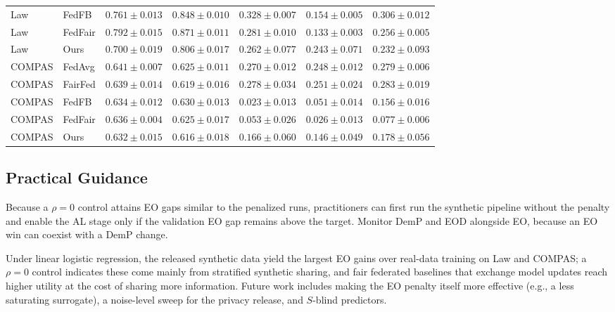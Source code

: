 \begin{table}[!t]
\begin{tabular}{@{}llccccc@{}}
Law & FedFB & \(0.761\pm0.013\) & \(0.848\pm0.010\) & \(0.328\pm0.007\) & \(0.154\pm0.005\) & \(0.306\pm0.012\) \\
Law & FedFair & \(0.792\pm0.015\) & \(0.871\pm0.011\) & \(0.281\pm0.010\) & \(0.133\pm0.003\) & \(0.256\pm0.005\) \\
Law & Ours & \(0.700\pm0.019\) & \(0.806\pm0.017\) & \(0.262\pm0.077\) & \(0.243\pm0.071\) & \(0.232\pm0.093\) \\
\midrule
COMPAS & FedAvg & \(0.641\pm0.007\) & \(0.625\pm0.011\) & \(0.270\pm0.012\) & \(0.248\pm0.012\) & \(0.279\pm0.006\) \\
COMPAS & FairFed & \(0.639\pm0.014\) & \(0.619\pm0.016\) & \(0.278\pm0.034\) & \(0.251\pm0.024\) & \(0.283\pm0.019\) \\
COMPAS & FedFB & \(0.634\pm0.012\) & \(0.630\pm0.013\) & \(0.023\pm0.013\) & \(0.051\pm0.014\) & \(0.156\pm0.016\) \\
COMPAS & FedFair & \(0.636\pm0.004\) & \(0.625\pm0.017\) & \(0.053\pm0.026\) & \(0.026\pm0.013\) & \(0.077\pm0.006\) \\
COMPAS & Ours & \(0.632\pm0.015\) & \(0.616\pm0.018\) & \(0.166\pm0.060\) & \(0.146\pm0.049\) & \(0.178\pm0.056\) \\
\bottomrule
\end{tabular}
\end{table}

\subsection{Practical Guidance}
Because a $\rho{=}0$ control attains EO gaps similar to the penalized runs, practitioners can first run the synthetic pipeline without the penalty and enable the AL stage only if the validation EO gap remains above the target.
Monitor DemP and EOD alongside EO, because an EO win can coexist with a DemP change.

Under linear logistic regression, the released synthetic data yield the largest EO gains over real-data training on Law and COMPAS; a $\rho{=}0$ control indicates these come mainly from stratified synthetic sharing, and fair federated baselines that exchange model updates reach higher utility at the cost of sharing more information. Future work includes making the EO penalty itself more effective (e.g., a less saturating surrogate), a noise-level sweep for the privacy release, and $S$-blind predictors.

